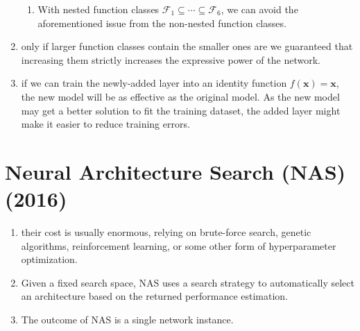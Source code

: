 \begin{enumerate}[itemsep=0.15cm]
\begin{enumerate}
        \item With nested function classes $\mathcal{F}_1 \subseteq \cdots \subseteq \mathcal{F}_6$, we can avoid the aforementioned issue from the non-nested function classes.

    \end{enumerate}

    \item only if larger function classes contain the smaller ones are we guaranteed that increasing them strictly increases the expressive power of the network.

    \item if we can train the newly-added layer into an identity function $f(\mathbf{x}) = \mathbf{x}$, the new model will be as effective as the original model. As the new model may get a better solution to fit the training dataset, the added layer might make it easier to reduce training errors.


\end{enumerate}



\section{Neural Architecture Search (NAS) (2016) \cite{dnn-1}} \label{neural architecture search (NAS)}

\begin{enumerate}
    \item their cost is usually enormous, relying on brute-force search, genetic algorithms, reinforcement learning, or some other form of hyperparameter optimization. 
    
    \item Given a fixed search space, NAS uses a search strategy to automatically select an architecture based on the returned performance estimation.
    
    \item The outcome of NAS is a single network instance.

\end{enumerate}


































